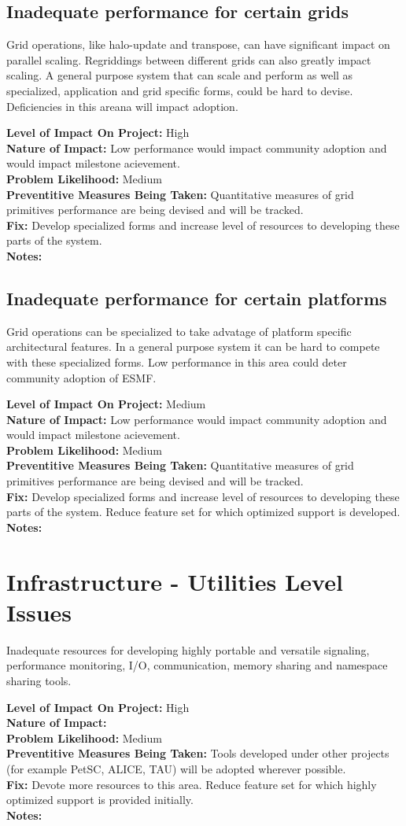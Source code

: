 \documentclass[english]{article}
\newcommand{\req}[1]{\section{\hspace{.2in}#1}}
\newcommand{\sreq}[1]{\subsection{\hspace{.2in}#1}}
\newenvironment
{reqlist}
{\begin{list} {} {} \rm \item[]}
{\end{list}}
\begin{document}
\sreq{Inadequate performance for certain grids}
Grid operations, like halo-update and transpose, can have significant impact on parallel scaling.
Regriddings between different grids can also greatly impact scaling.
A general purpose system that can scale and perform as well as specialized, application and
grid specific forms, could be hard to devise. Deficiencies in this areana will
impact adoption.
\begin{reqlist} 
{\bf Level of Impact On Project:} High \\ 
{\bf Nature of Impact:} Low performance would impact community adoption and
would impact milestone acievement.\\
{\bf Problem Likelihood:} Medium \\
{\bf Preventitive Measures Being Taken:} Quantitative measures of grid primitives
performance are being devised and will be tracked.\\
{\bf Fix:} Develop specialized forms and increase level of resources
to developing these parts of the system.\\
{\bf Notes:} 
\end{reqlist}

\sreq{Inadequate performance for certain platforms}
Grid operations can be specialized to take advatage of platform specific
architectural features. In a general purpose system it can be hard to compete with these
specialized forms. Low performance in this area could deter community adoption of ESMF.
\begin{reqlist}
{\bf Level of Impact On Project:} Medium \\
{\bf Nature of Impact:} Low performance would impact community adoption and
would impact milestone acievement.\\
{\bf Problem Likelihood:} Medium \\
{\bf Preventitive Measures Being Taken:} Quantitative measures of grid primitives
performance are being devised and will be tracked.\\
{\bf Fix:} Develop specialized forms and increase level of resources
to developing these parts of the system. Reduce feature set for which
optimized support is developed.
\\
{\bf Notes:} 
\end{reqlist}

\req{Infrastructure - Utilities Level Issues}
Inadequate resources for developing highly portable and versatile
signaling, performance monitoring, I/O, communication, memory sharing and namespace sharing tools.
\begin{reqlist}
{\bf Level of Impact On Project:} High \\
{\bf Nature of Impact:} \\
{\bf Problem Likelihood:} Medium \\
{\bf Preventitive Measures Being Taken:} Tools developed under other projects (for example PetSC, ALICE, TAU)
will be adopted wherever possible.
\\
{\bf Fix:} Devote more resources to this area. Reduce feature set for which
highly optimized support is provided initially. \\
{\bf Notes:} 
\end{reqlist}
\end{document}
